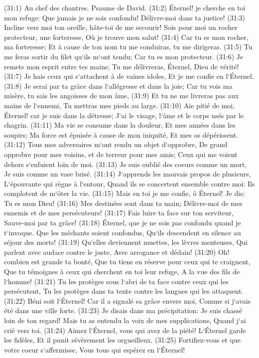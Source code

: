 \verse (31:1) Au chef des chantres. Psaume de David. (31:2) Éternel! je cherche en toi mon refuge: Que jamais je ne sois confondu! Délivre-moi dans ta justice! 
\verse (31:3) Incline vers moi ton oreille, hâte-toi de me secourir! Sois pour moi un rocher protecteur, une forteresse, Où je trouve mon salut! 
\verse (31:4) Car tu es mon rocher, ma forteresse; Et à cause de ton nom tu me conduiras, tu me dirigeras. 
\verse (31:5) Tu me feras sortir du filet qu`ils m`ont tendu; Car tu es mon protecteur. 
\verse (31:6) Je remets mon esprit entre tes mains; Tu me délivreras, Éternel, Dieu de vérité! 
\verse (31:7) Je hais ceux qui s`attachent à de vaines idoles, Et je me confie en l`Éternel. 
\verse (31:8) Je serai par ta grâce dans l`allégresse et dans la joie; Car tu vois ma misère, tu sais les angoisses de mon âme, 
\verse (31:9) Et tu ne me livreras pas aux mains de l`ennemi, Tu mettras mes pieds au large. 
\verse (31:10) Aie pitié de moi, Éternel! car je suis dans la détresse; J`ai le visage, l`âme et le corps usés par le chagrin. 
\verse (31:11) Ma vie se consume dans la douleur, Et mes années dans les soupirs; Ma force est épuisée à cause de mon iniquité, Et mes os dépérissent. 
\verse (31:12) Tous mes adversaires m`ont rendu un objet d`opprobre, De grand opprobre pour mes voisins, et de terreur pour mes amis; Ceux qui me voient dehors s`enfuient loin de moi. 
\verse (31:13) Je suis oublié des coeurs comme un mort, Je suis comme un vase brisé. 
\verse (31:14) J`apprends les mauvais propos de plusieurs, L`épouvante qui règne à l`entour, Quand ils se concertent ensemble contre moi: Ils complotent de m`ôter la vie. 
\verse (31:15) Mais en toi je me confie, ô Éternel! Je dis: Tu es mon Dieu! 
\verse (31:16) Mes destinées sont dans ta main; Délivre-moi de mes ennemis et de mes persécuteurs! 
\verse (31:17) Fais luire ta face sur ton serviteur, Sauve-moi par ta grâce! 
\verse (31:18) Éternel, que je ne sois pas confondu quand je t`invoque. Que les méchants soient confondus, Qu`ils descendent en silence au séjour des morts! 
\verse (31:19) Qu`elles deviennent muettes, les lèvres menteuses, Qui parlent avec audace contre le juste, Avec arrogance et dédain! 
\verse (31:20) Oh! combien est grande ta bonté, Que tu tiens en réserve pour ceux qui te craignent, Que tu témoignes à ceux qui cherchent en toi leur refuge, A la vue des fils de l`homme! 
\verse (31:21) Tu les protèges sous l`abri de ta face contre ceux qui les persécutent, Tu les protèges dans ta tente contre les langues qui les attaquent. 
\verse (31:22) Béni soit l`Éternel! Car il a signalé sa grâce envers moi, Comme si j`avais été dans une ville forte. 
\verse (31:23) Je disais dans ma précipitation: Je suis chassé loin de ton regard! Mais tu as entendu la voix de mes supplications, Quand j`ai crié vers toi. 
\verse (31:24) Aimez l`Éternel, vous qui avez de la piété! L`Éternel garde les fidèles, Et il punit sévèrement les orgueilleux. 
\verse (31:25) Fortifiez-vous et que votre coeur s`affermisse, Vous tous qui espérez en l`Éternel! 

